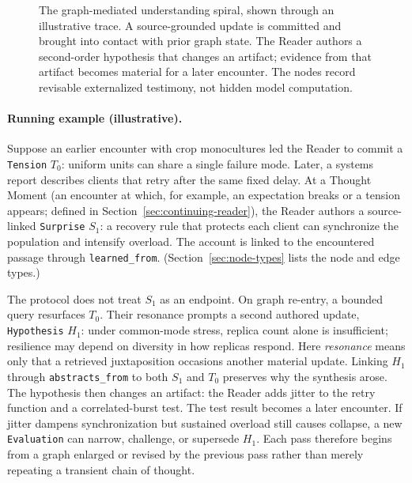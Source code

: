 \begin{figure}[htbp]
\caption{The graph-mediated understanding spiral, shown through an illustrative trace. A source-grounded update is committed and brought into contact with prior graph state. The Reader authors a second-order hypothesis that changes an artifact; evidence from that artifact becomes material for a later encounter. The nodes record revisable externalized testimony, not hidden model computation.}
\label{fig:understanding-spiral}
\end{figure}

\paragraph{Running example (illustrative).}
Suppose an earlier encounter with crop monocultures led the Reader to commit a \texttt{Tension} $T_0$: uniform units can share a single failure mode. Later, a systems report describes clients that retry after the same fixed delay. At a Thought Moment (an encounter at which, for example, an expectation breaks or a tension appears; defined in Section~\ref{sec:continuing-reader}), the Reader authors a source-linked \texttt{Surprise} $S_1$: a recovery rule that protects each client can synchronize the population and intensify overload. The account is linked to the encountered passage through \texttt{learned\_from}. (Section~\ref{sec:node-types} lists the node and edge types.)

The protocol does not treat $S_1$ as an endpoint. On graph re-entry, a bounded query resurfaces $T_0$. Their resonance prompts a second authored update, \texttt{Hypothesis} $H_1$: under common-mode stress, replica count alone is insufficient; resilience may depend on diversity in how replicas respond. Here \emph{resonance} means only that a retrieved juxtaposition occasions another material update. Linking $H_1$ through \texttt{abstracts\_from} to both $S_1$ and $T_0$ preserves why the synthesis arose. The hypothesis then changes an artifact: the Reader adds jitter to the retry function and a correlated-burst test. The test result becomes a later encounter. If jitter dampens synchronization but sustained overload still causes collapse, a new \texttt{Evaluation} can narrow, challenge, or supersede $H_1$. Each pass therefore begins from a graph enlarged or revised by the previous pass rather than merely repeating a transient chain of thought.

